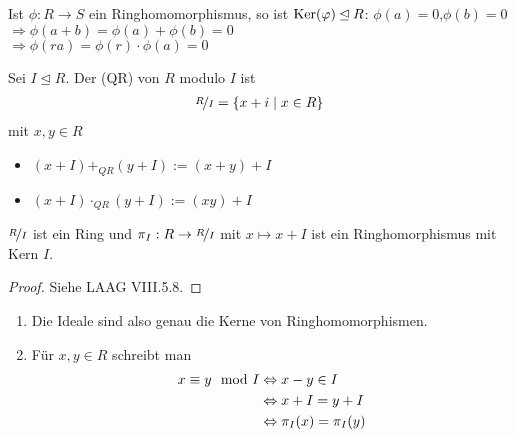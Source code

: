 \begin{example}
	Ist $\phi: R \to S$ ein Ringhomomorphismus, so ist $\operatorname{Ker}(\varphi) \unlhd R$: $\phi(a) = 0$,$ \phi(b) = 0$ \\
	$\Rightarrow \phi(a+b) = \phi(a) + \phi(b) = 0$\\
	$\Rightarrow \phi(ra) = \phi(r)\cdot \phi(a) = 0$
\end{example}

\begin{definition}[Quotientenring] 
	Sei $I \unlhd R$. Der  (QR) von $R$ modulo $I$ ist
	\begin{align}
		\nicefrac{R}{I} = \{x+i\mid x\in R\}\notag
	\end{align}
	mit $x, y \in R$
	\begin{itemize}
		\item $(x+ I) +_{QR} (y+I) := (x+y) +I$
		\item $(x+I) \cdot_{QR} (y+I) := (xy) +I$
	\end{itemize}
\end{definition}

\begin{proposition}
	$\nicefrac{R}{I}$ ist ein Ring und $\pi_I : R \to \nicefrac{R}{I}$ mit $x \mapsto x +I$ ist ein Ringhomorphismus mit Kern $I$.
\end{proposition}
\begin{proof}
	Siehe LAAG VIII.5.8.
\end{proof}

\begin{remark}
	\begin{enumerate}[label=(\alph*)]
		\item Die Ideale sind also genau die Kerne von Ringhomomorphismen.
		\item Für $x,y \in R$ schreibt man
		\begin{align}
			x \equiv y \mod I &\Leftrightarrow x - y \in I\notag \\
			&\Leftrightarrow x+I = y+I\notag \\
			&\Leftrightarrow \pi_I(x) = \pi_I(y) \notag
		\end{align}
	\end{enumerate}
\end{remark}

